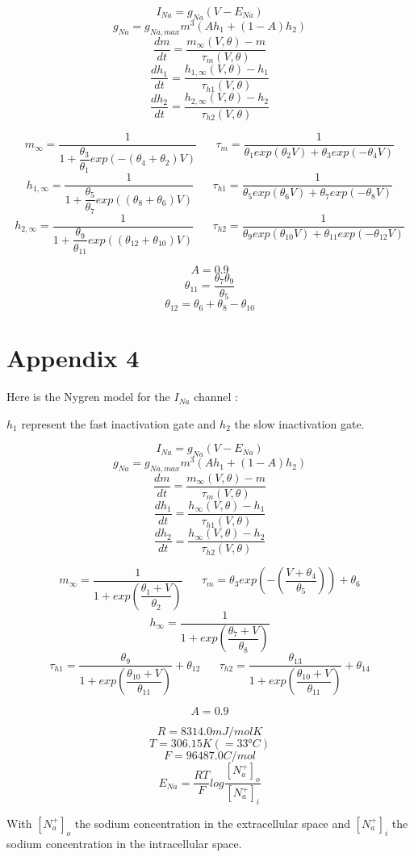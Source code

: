\documentclass[11pt]{report}
\begin{document}
$$I_{Na} = g_{Na}(V-E_{Na})$$
$$g_{Na} = g_{Na,max}m^{3}(Ah_1 + (1-A)h_2) $$
$$\dfrac{dm}{dt} = \dfrac{m_{\infty}(V,\theta) - m}{\tau_{m}(V,\theta)}$$
$$\dfrac{dh_1}{dt} = \dfrac{h_{1,\infty}(V,\theta) - h_1}{\tau_{h1}(V,\theta)}$$
$$\dfrac{dh_2}{dt} = \dfrac{h_{2,\infty}(V,\theta) - h_2}{\tau_{h2}(V,\theta)}$$

$$m_{\infty} = \dfrac{1}{1 + \dfrac{\theta_{3}}{\theta_{1}}exp(-(\theta_{4} + \theta_{2})V) } \; \; \; \; \; \; \tau_{m} = \dfrac{1}{\theta_{1}exp(\theta_{2}V)+\theta_{3}exp(-\theta_{4}V)} $$
$$h_{1,\infty} = \dfrac{1}{1 + \dfrac{\theta_{5}}{\theta_{7}}exp((\theta_{8} + \theta_{6})V) }
\; \; \; \; \; \; \tau_{h1} = \dfrac{1}{\theta_{5}exp(\theta_{6}V)+\theta_{7}exp(-\theta_{8}V)}$$
$$h_{2,\infty} = \dfrac{1}{1 + \dfrac{\theta_{9}}{\theta_{11}}exp((\theta_{12} + \theta_{10})V) } \; \; \; \; \; \; \tau_{h2} = \dfrac{1}{\theta_{9}exp(\theta_{10}V)+\theta_{11}exp(-\theta_{12}V)}$$

$$A = 0.9$$
$$\theta_{11} = \dfrac{\theta_{7}\theta_{9}}{\theta_{5}}$$
$$\theta_{12} = \theta_{6} + \theta_{8} - \theta_{10}$$

\section{Appendix 4}

Here is the Nygren \cite{Nygren1998} model for the $I_{Na}$ channel :

$h_1$ represent the fast inactivation gate and $h_2$ the slow inactivation gate.

$$I_{Na} = g_{Na}(V-E_{Na})$$
$$g_{Na} = g_{Na,max}m^{3}(Ah_1 + (1-A)h_2) $$
$$\dfrac{dm}{dt} = \dfrac{m_{\infty}(V,\theta) - m}{\tau_{m}(V,\theta)}$$
$$\dfrac{dh_1}{dt} = \dfrac{h_{\infty}(V,\theta) - h_1}{\tau_{h1}(V,\theta)}$$
$$\dfrac{dh_2}{dt} = \dfrac{h_{\infty}(V,\theta) - h_2}{\tau_{h2}(V,\theta)}$$

$$m_{\infty} = \dfrac{1}{1 + exp \left(\dfrac{\theta_{1} +V}{\theta_{2}}\right)} \; \; \; \; \; \; \tau_{m} = \theta_{3}exp \left( -\left(\dfrac{V + \theta_{4}}{\theta_{5}}\right) \right) + \theta_{6} $$
$$h_{\infty} = \dfrac{1}{1 + exp \left(\dfrac{\theta_{7} +V}{\theta_{8}}\right)}$$
$$\tau_{h1} = \dfrac{\theta_{9}}{1 + exp \left(\dfrac{\theta_{10} +V}{\theta_{11}}\right)} + \theta_{12} \; \; \; \; \; \; \tau_{h2} = \dfrac{\theta_{13}}{1 + exp \left(\dfrac{\theta_{10} +V}{\theta_{11}}\right)} + \theta_{14}$$

$$A = 0.9$$

$$R = 8314.0 mJ/molK$$
$$T = 306.15 K (=33°C) $$
$$F = 96487.0 C/mol$$
$$E_{Na} = \dfrac{RT}{F}log\dfrac{[N_a^+]_o}{[N_a^+]_i}$$

With $[N_a^+]_o$ the sodium concentration in the extracellular space and $[N_a^+]_i$ the sodium concentration in the intracellular space.
\end{document}
